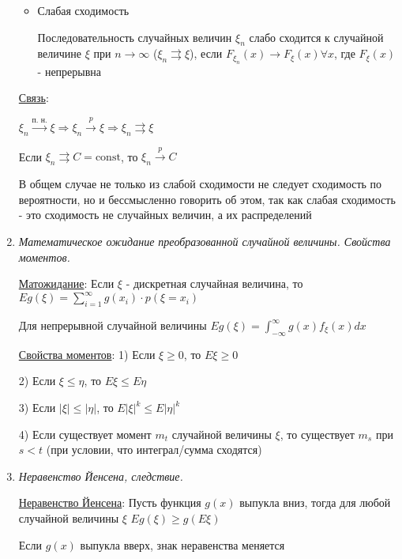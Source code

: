 \begin{enumerate}
\begin{itemize}
        \item Слабая сходимость

        \Defs Последовательность случайных величин $\xi_n$ слабо сходится к случайной величине $\xi$ при $n \to \infty$
        ($\xi_n \rightrightarrows \xi$), если $F_{\xi_n}(x) \longrightarrow F_\xi(x) \forall x$, где $F_\xi(x)$ - непрерывна
    \end{itemize}

    \hyperlink{connectionbetweenconvergencetypes}{Связь}: 

    \Ths $\xi_n \overset{\text{п. н.}}{\longrightarrow} \xi \Longrightarrow \xi_n \overset{p}{\longrightarrow} \xi \Longrightarrow \xi_n \rightrightarrows \xi$

    \Ths Если $\xi_n \rightrightarrows C = \mathrm{const}$, то $\xi_n \overset{p}{\longrightarrow} C$

    \Nota В общем случае не только из слабой сходимости не следует сходимость по вероятности, но и бессмысленно говорить
    об этом, так как слабая сходимость - это сходимость не случайных величин, а их распределений

    \item \textit{Математическое ожидание преобразованной случайной величины. Свойства моментов.}
    
    \hyperlink{expectedvalueoftransformedvariable}{Матожидание}: \Ths Если $\xi$ - дискретная случайная величина, то $Eg(\xi) = \sum_{i = 1}^\infty g(x_i) \cdot p(\xi = x_i)$

    Для непрерывной случайной величины $Eg(\xi) = \int_{-\infty}^{\infty} g(x) f_\xi(x) dx$

    \hyperlink{momentsproperties}{Свойства моментов}: 1) Если $\xi \geq 0$, то $E\xi \geq 0$

    2) Если $\xi \leq \eta$, то $E\xi \leq E\eta$

    3) Если $|\xi| \leq |\eta|$, то $E|\xi|^k \leq E|\eta|^k$

    4) Если существует момент $m_t$ случайной величины $\xi$, то существует $m_s$ при $s < t$ (при условии, что интеграл/сумма сходятся)

    
    \item \textit{Неравенство Йенсена, следствие.}

    \hyperlink{jensensinequality}{Неравенство Йенсена}: \Ths Пусть функция $g(x)$ выпукла вниз, тогда для любой случайной величины $\xi$ $Eg(\xi) \geq g(E\xi)$

    \Nota Если $g(x)$ выпукла вверх, знак неравенства меняется


\end{enumerate}
